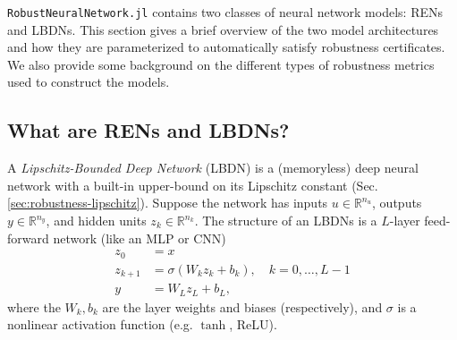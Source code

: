 \verb|RobustNeuralNetwork.jl| contains two classes of neural network models: RENs and LBDNs. This section gives a brief overview of the two model architectures and how they are parameterized to automatically satisfy robustness certificates. We also provide some background on the different types of robustness metrics used to construct the models.

\subsection{What are RENs and LBDNs?} \label{sec:model-structures}

A \textit{Lipschitz-Bounded Deep Network} (LBDN) is a (memoryless) deep neural network with a built-in upper-bound on its Lipschitz constant (Sec. \ref{sec:robustness-lipschitz}). Suppose the network has inputs $u \in\mathbb{R}^{n_u}$, outputs $y \in \mathbb{R}^{n_y}$, and hidden units $z_k \in \mathbb{R}^{n_k}$. The structure of an LBDNs is a $L$-layer feed-forward network (like an MLP or CNN)
\begin{align} 
z_0 &= x \label{eqn:lbdn-z0}\\
z_{k+1} &= \sigma(W_k z_k + b_k), \quad k = 0, \ldots, L-1 \label{eqn:lbdn-sandwich}\\
y &= W_L z_L + b_L, \label{eqn:lbdn-output}
\end{align}
where the $W_k, b_k$ are the layer weights and biases (respectively), and $\sigma$ is a nonlinear activation function (e.g. $\tanh$, ReLU).

